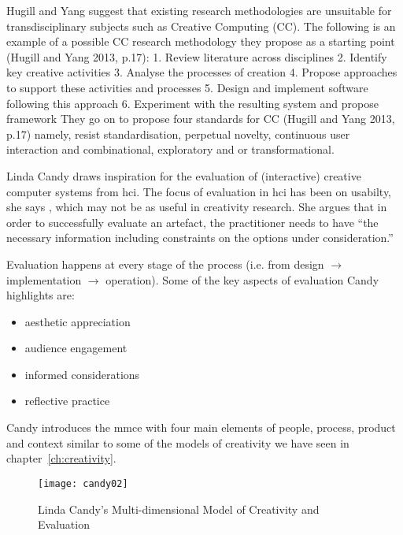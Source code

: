 \begin{draft}
  Hugill and Yang suggest that existing research methodologies are unsuitable for transdisciplinary subjects such as Creative Computing (CC). The following is an example of a possible CC research methodology they propose as a starting point (Hugill and Yang 2013, p.17):
  1. Review literature across disciplines
  2. Identify key creative activities
  3. Analyse the processes of creation
  4. Propose approaches to support these activities and processes 5. Design and implement software following this approach
  6. Experiment with the resulting system and propose framework
  They go on to propose four standards for CC (Hugill and Yang 2013, p.17) namely, resist standardisation, perpetual novelty, continuous user interaction and combinational, exploratory and or transformational.
\end{draft}


\spirals

Linda Candy draws inspiration for the evaluation of (interactive) creative computer systems from \gls{hci}. The focus of evaluation in \gls{hci} has been on usabilty, she says \autocite[p.23]{Candy2012}, which may not be as useful in creativity research. She argues that in order to successfully evaluate an artefact, the practitioner needs to have ``the necessary information including constraints on the options under consideration.'' \autocite[p.7]{Candy2012}

Evaluation happens at every stage of the process (i.e. from design $\to$ implementation $\to$ operation). Some of the key aspects of evaluation Candy highlights are:

\begin{itemize}
  \item aesthetic appreciation
  \item audience engagement
  \item informed considerations
  \item reflective practice
\end{itemize}

Candy introduces the \gls{mmce} with four main elements of people, process, product and context \autocite[p.11]{Candy2012} similar to some of the models of creativity we have seen in chapter~\ref{ch:creativity}.

\begin{figure}[htb] %
  \centering
  \texttt{[image: candy02]}
\caption[Multi-dimensional Model of Creativity and Evaluation]{Linda Candy's Multi-dimensional Model of Creativity and Evaluation}
\label{fig:candy02}
\end{figure}

